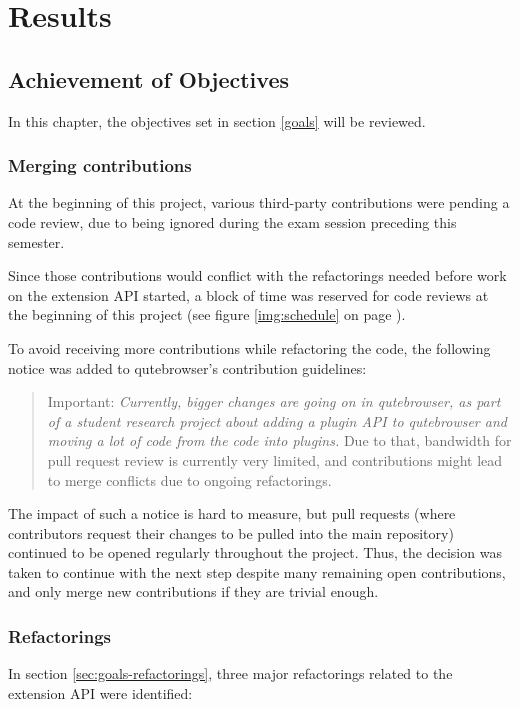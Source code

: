 
\chapter{Results}
\label{ch:results}

\section{Achievement of Objectives}

In this chapter, the objectives set in section \ref{goals} will be reviewed.

\subsection{Merging contributions}
\label{sec:merging}
At the beginning of this project, various third-party contributions were pending
a code review, due to being ignored during the exam session preceding this
semester.

Since those contributions would conflict with the refactorings needed before
work on the extension API started, a block of time was reserved for code
reviews at the beginning of this project (see figure \ref{img:schedule} on page
\pageref{img:schedule}).

To avoid receiving more contributions while refactoring the code, the
following notice was added to qutebrowser's contribution guidelines:

\begin{quote}
Important: \emph{Currently, bigger changes are going on in qutebrowser, as
part of a student research project about adding a plugin API to qutebrowser
and moving a lot of code from the code into plugins.} Due to that, bandwidth
for pull request review is currently very limited, and contributions might lead
to merge conflicts due to ongoing refactorings.
\end{quote}

The impact of such a notice is hard to measure, but pull requests (where
contributors request their changes to be pulled into the main repository)
continued to be opened regularly throughout the project. Thus, the decision was
taken to continue with the next step despite many remaining open contributions,
and only merge new contributions if they are trivial enough.

\subsection{Refactorings}
In section \ref{sec:goals-refactorings}, three major refactorings related to the
extension API were identified:

